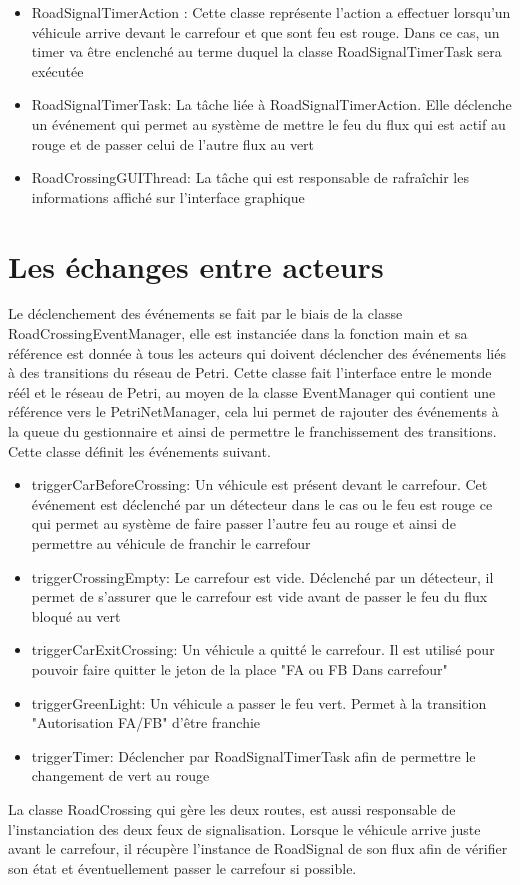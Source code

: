 \documentclass[11pt,a4paper, openany]{memoir}
\begin{document}
\begin{itemize}
\item RoadSignalTimerAction : Cette classe représente l'action a effectuer lorsqu'un véhicule arrive devant le carrefour et que sont feu est rouge. Dans ce cas, un timer va être enclenché au terme duquel la classe RoadSignalTimerTask sera exécutée
\item RoadSignalTimerTask: La tâche liée à RoadSignalTimerAction. Elle déclenche un événement qui permet au système de mettre le feu du flux qui est actif au rouge et de passer celui de l'autre flux au vert
\item RoadCrossingGUIThread: La tâche qui est responsable de rafraîchir les informations affiché sur l'interface graphique
\end{itemize}

\chapter{Les échanges entre acteurs}

Le déclenchement des événements se fait par le biais de la classe RoadCrossingEventManager, elle est instanciée dans la fonction main et sa référence est donnée à tous les acteurs qui doivent déclencher des événements liés à des transitions du réseau de Petri. Cette classe fait l'interface entre le monde réél et le réseau de Petri, au moyen de la classe EventManager qui contient une référence vers le PetriNetManager, cela lui permet de rajouter des événements à la queue du gestionnaire et ainsi de permettre le franchissement des transitions.
Cette classe définit les événements suivant.\\
\begin{itemize}
\item triggerCarBeforeCrossing: Un véhicule est présent devant le carrefour. Cet événement est déclenché par un détecteur  dans le cas ou le feu est rouge ce qui permet au système de faire passer l'autre feu au rouge et ainsi de permettre au véhicule de franchir le carrefour
\item triggerCrossingEmpty: Le carrefour est vide. Déclenché par un détecteur, il permet de s'assurer que le carrefour est vide avant de passer le feu du flux bloqué au vert
\item triggerCarExitCrossing: Un véhicule a quitté le carrefour. Il est utilisé pour pouvoir faire quitter le jeton de la place "FA ou FB Dans carrefour"
\item triggerGreenLight: Un véhicule a passer le feu vert. Permet à la transition "Autorisation FA/FB" d'être franchie
\item triggerTimer: Déclencher par RoadSignalTimerTask afin de permettre le changement de vert au rouge\\
\end{itemize}
La classe RoadCrossing qui gère les deux routes, est aussi responsable de l'instanciation des deux feux de signalisation. Lorsque le véhicule arrive juste avant le carrefour, il récupère l'instance de RoadSignal de son flux afin de vérifier son état et éventuellement passer le carrefour si possible.
\end{document}
